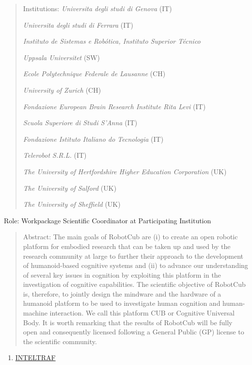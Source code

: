 \begin{quote}
Institutions: \emph{Universita degli studi di Genova} (IT)

\emph{Universita degli studi di Ferrara} (IT)

\emph{Instituto de Sistemas e Robótica, Instituto Superior Técnico}

\emph{Uppsala Universitet} (SW)

\emph{Ecole Polytechnique Federale de Lausanne} (CH)

\emph{University of Zurich} (CH)

\emph{Fondazione European Brain Research Institute Rita Levi} (IT)

\emph{Scuola Superiore di Studi S'Anna} (IT)

\emph{Fondazione Istituto Italiano do Tecnologia} (IT)

\emph{Telerobot S.R.L.} (IT)

\emph{The University of Hertfordshire Higher Education Corporation} (UK)

\emph{The University of Salford} (UK)

\emph{The University of Sheffield} (UK)
\end{quote}

Role: Workpackage Scientific Coordinator at Participating Institution

\begin{quote}
Abstract: The main goals of RobotCub are (i) to create an open robotic
platform for embodied research that can be taken up and used by the
research community at large to further their approach to the development
of humanoid-based cognitive systems and (ii) to advance our
understanding of several key issues in cognition by exploiting this
platform in the investigation of cognitive capabilities. The scientific
objective of RobotCub is, therefore, to jointly design the mindware and
the hardware of a humanoid platform to be used to investigate human
cognition and human-machine interaction. We call this platform CUB or
Cognitive Universal Body. It is worth remarking that the results of
RobotCub will be fully open and consequently licensed following a
General Public (GP) license to the scientific community.
\end{quote}

\begin{enumerate}
\def\labelenumi{\arabic{enumi}.}
\setcounter{enumi}{15}
\item
  \ul{INTELTRAF}
\end{enumerate}

